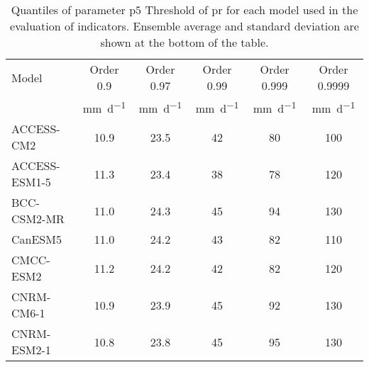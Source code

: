 \begin{table}
  \centering
  \caption{Quantiles of parameter $\mathrm{p5}$ {Threshold of \gls{pr}} for each model used in the evaluation of indicators. Ensemble average and standard deviation are shown at the bottom of the table.}
  \label{tab:parameters_wetdays_thresh}
  \begin{tabular}{lccccc}
  Model              & Order 0.9                          & Order 0.97                         & Order 0.99                         & Order 0.999                        & Order 0.9999                       \\
                     & \unit{\milli\metre\per\day}        & \unit{\milli\metre\per\day}        & \unit{\milli\metre\per\day}        & \unit{\milli\metre\per\day}        & \unit{\milli\metre\per\day}        \\
  \hline
  ACCESS-CM2         & 10.9                               & 23.5                               & 42                                 & 80                                 & 100                                \\
  ACCESS-ESM1-5      & 11.3                               & 23.4                               & 38                                 & 78                                 & 120                                \\
  BCC-CSM2-MR        & 11.0                               & 24.3                               & 45                                 & 94                                 & 130                                \\
  CanESM5            & 11.0                               & 24.2                               & 43                                 & 82                                 & 110                                \\
  CMCC-ESM2          & 11.2                               & 24.2                               & 42                                 & 82                                 & 120                                \\
  CNRM-CM6-1         & 10.9                               & 23.9                               & 45                                 & 92                                 & 130                                \\
  CNRM-ESM2-1        & 10.8                               & 23.8                               & 45                                 & 95                                 & 130                                \\

\end{tabular}
\end{table}
